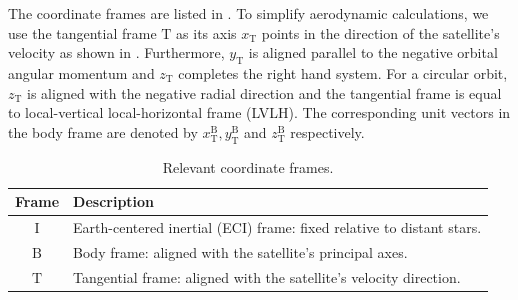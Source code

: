 \documentclass[pdflatex,sn-mathphys-num]{sn-jnl}%
\theoremstyle{thmstyleone}%
\theoremstyle{thmstyletwo}%
\theoremstyle{thmstylethree}%
\begin{document}
		The coordinate frames are listed in .
		To simplify aerodynamic calculations, we use the tangential frame $\text{T}$ as its axis $x_{\text{T}}$ points in the direction of the satellite's velocity as shown in .
		Furthermore, $y_{\text{T}}$ is aligned parallel to the negative orbital angular momentum and $z_{\text{T}}$ completes the right hand system.
		For a circular orbit, $z_{\text{T}}$ is aligned with the negative radial direction and the tangential frame is equal to local-vertical local-horizontal frame (LVLH).
		The corresponding unit vectors in the body frame are denoted by $x^{\text{B}}_{\text{T}}, y^{\text{B}}_{\text{T}}$ and $z^{\text{B}}_{\text{T}}$ respectively.

		\begin{table}[h]
			\renewcommand{\arraystretch}{1.1}
			\begin{tabular}{c p{6cm}} %
				\hline
				\textbf{Frame} & \textbf{Description} \\ \hline
				$\text{I}$     & Earth-centered inertial (ECI) frame: fixed relative to distant stars. \\
				$\text{B}$     & Body frame: aligned with the satellite's principal axes. \\
				$\text{T}$     & Tangential frame: aligned with the satellite's velocity direction. \\ \hline
			\end{tabular}
			\caption{Relevant coordinate frames.}
			\label{tab:frames}
		\end{table}
\end{document}
